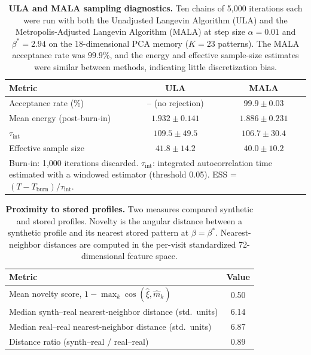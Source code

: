 \begin{table}[ht]
\centering
\caption{\textbf{ULA and MALA sampling diagnostics.} Ten chains of 5{,}000
iterations each were run with both the Unadjusted Langevin Algorithm (ULA)
and the Metropolis-Adjusted Langevin Algorithm (MALA) at step size
$\alpha = 0.01$ and $\beta^* = 2.94$ on the 18-dimensional PCA memory
($K{=}23$ patterns). The MALA acceptance rate was $99.9\%$, and the energy and effective
sample-size estimates were similar between methods, indicating little discretization bias.
}
\label{tab:ula-vs-mala}
\begin{tabular}{lcc}
\toprule
Metric & ULA & MALA \\
\midrule
Acceptance rate (\%)         & -- (no rejection) & $99.9 \pm 0.03$ \\
Mean energy (post-burn-in)   & $1.932 \pm 0.141$ & $1.886 \pm 0.231$ \\
$\tau_{\text{int}}$          & $109.5 \pm 49.5$  & $106.7 \pm 30.4$ \\
Effective sample size        & $41.8 \pm 14.2$   & $40.0 \pm 10.2$ \\
\bottomrule
\multicolumn{3}{p{0.85\textwidth}}{\small Burn-in: 1{,}000 iterations discarded. $\tau_{\text{int}}$: integrated
autocorrelation time estimated with a windowed estimator (threshold 0.05).
ESS = $(T - T_{\text{burn}}) / \tau_{\text{int}}$.}
\end{tabular}
\end{table}

\begin{table}[ht]
\centering
\caption{\textbf{Proximity to stored profiles.} Two measures compared synthetic and stored
profiles. Novelty is the angular distance between a synthetic profile and its
nearest stored pattern at $\beta = \beta^*$. Nearest-neighbor distances are
computed in the per-visit standardized 72-dimensional feature space.}
\label{stab:memorization}
\begin{tabular}{lc}
\toprule
Metric & Value \\
\midrule
Mean novelty score, $1 - \max_k \cos(\hat{\xi}, \hat{m}_k)$ & 0.50 \\
Median synth--real nearest-neighbor distance (std.\ units) & 6.14 \\
Median real--real nearest-neighbor distance (std.\ units)  & 6.87 \\
Distance ratio (synth--real / real--real)                  & 0.89 \\
\bottomrule
\end{tabular}
\end{table}

